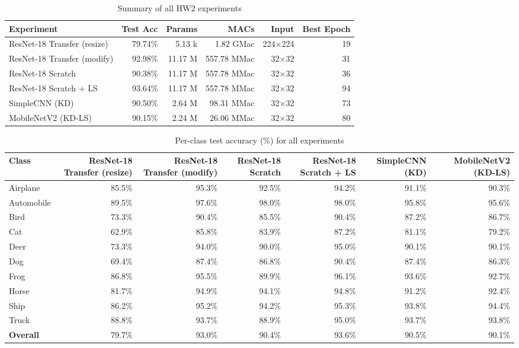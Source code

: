 \documentclass[12pt,a4paper]{article}
\begin{document}
\begin{table}[H]
  \centering
  \caption{Summary of all HW2 experiments}
  \label{tab:overall}
  \begin{tabular}{lrrrrr}
    \toprule
    Experiment & Test Acc & Params & MACs & Input & Best Epoch \\
    \midrule
  ResNet-18 Transfer (resize) & 79.74\% & 5.13 k & 1.82 GMac & 224$\times$224 & 19 \\
  ResNet-18 Transfer (modify) & 92.98\% & 11.17 M & 557.78 MMac & 32$\times$32 & 31 \\
  ResNet-18 Scratch & 90.38\% & 11.17 M & 557.78 MMac & 32$\times$32 & 36 \\
  ResNet-18 Scratch + LS & 93.64\% & 11.17 M & 557.78 MMac & 32$\times$32 & 94 \\
  SimpleCNN (KD) & 90.50\% & 2.64 M & 98.31 MMac & 32$\times$32 & 73 \\
  MobileNetV2 (KD-LS) & 90.15\% & 2.24 M & 26.06 MMac & 32$\times$32 & 80 \\
    \bottomrule
  \end{tabular}
\end{table}

\begin{table}[H]
  \centering
  \caption{Per-class test accuracy (\%) for all experiments}
  \label{tab:all_perclass}
  \begin{tabular}{lrrrrrr}
    \toprule
    Class & ResNet-18 Transfer (resize) & ResNet-18 Transfer (modify) & ResNet-18 Scratch & ResNet-18 Scratch + LS & SimpleCNN (KD) & MobileNetV2 (KD-LS) \\
    \midrule
  Airplane & 85.5\% & 95.3\% & 92.5\% & 94.2\% & 91.1\% & 90.3\% \\
  Automobile & 89.5\% & 97.6\% & 98.0\% & 98.0\% & 95.8\% & 95.6\% \\
  Bird & 73.3\% & 90.4\% & 85.5\% & 90.4\% & 87.2\% & 86.7\% \\
  Cat & 62.9\% & 85.8\% & 83.9\% & 87.2\% & 81.1\% & 79.2\% \\
  Deer & 73.3\% & 94.0\% & 90.0\% & 95.0\% & 90.1\% & 90.1\% \\
  Dog & 69.4\% & 87.4\% & 86.8\% & 90.4\% & 87.4\% & 86.3\% \\
  Frog & 86.8\% & 95.5\% & 89.9\% & 96.1\% & 93.6\% & 92.7\% \\
  Horse & 81.7\% & 94.9\% & 94.1\% & 94.8\% & 91.2\% & 92.4\% \\
  Ship & 86.2\% & 95.2\% & 94.2\% & 95.3\% & 93.8\% & 94.4\% \\
  Truck & 88.8\% & 93.7\% & 88.9\% & 95.0\% & 93.7\% & 93.8\% \\
    \midrule
    \textbf{Overall} & 79.7\% & 93.0\% & 90.4\% & 93.6\% & 90.5\% & 90.1\% \\
    \bottomrule
  \end{tabular}
\end{table}
\end{document}

